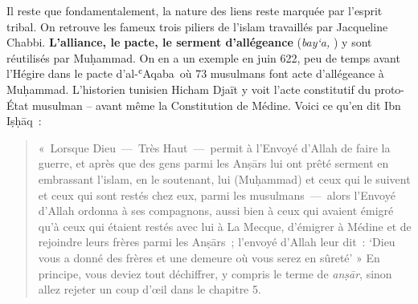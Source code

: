 Il reste que fondamentalement, la nature des liens reste marquée par
l'esprit tribal. On retrouve les fameux trois piliers de l'islam
travaillés par Jacqueline Chabbi. \textbf{L'alliance, le pacte, le
serment d'allégeance} (\emph{bay`a,} ‎‎) y sont réutilisés
par Muḥammad. On en a un exemple en juin 622, peu de temps avant
l'Hégire dans le pacte d'al-ʿAqaba~où 73 musulmans font acte
d'allégeance à Muḥammad. L'historien tunisien Hicham Djaït y voit l'acte
constitutif du proto-État musulman -- avant même la Constitution de
Médine. Voici ce qu'en dit Ibn Iṣḥāq~:

\begin{quote}
«~Lorsque Dieu~---~Très Haut~---~permit à l'Envoyé d'Allah de faire la
guerre, et après que des gens parmi les Anṣārs lui ont prêté serment en
embrassant l'islam, en le soutenant, lui (Muḥammad) et ceux qui le
suivent et ceux qui sont restés chez eux, parmi les musulmans~---~alors
l'Envoyé d'Allah ordonna à ses compagnons, aussi bien à ceux qui avaient
émigré qu'à ceux qui étaient restés avec lui à La Mecque, d'émigrer à
Médine et de rejoindre leurs frères parmi les Anṣārs~; l'envoyé d'Allah
leur dit~: `Dieu vous a donné des frères et une demeure où vous serez en
sûreté' » En principe, vous deviez tout
déchiffrer, y compris le terme de \emph{anṣār}, sinon allez rejeter un
coup d'œil dans le chapitre 5.
\end{quote}

